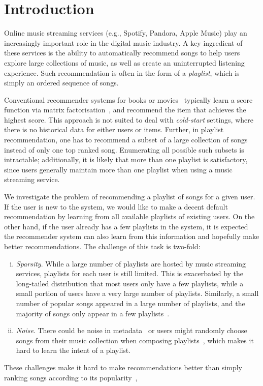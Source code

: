 
\section{Introduction}
\label{sec:intro}
Online music streaming services (e.g., Spotify, Pandora, Apple Music) %
play an increasingly important role in the digital music industry.
A key ingredient of these services is the ability to automatically recommend songs to help users explore large collections of music,
as well as create an uninterrupted listening experience.
Such recommendation is often in the form of a \emph{playlist}, which is simply an ordered sequence of songs.

Conventional recommender systems for books or movies~\citep{Sarwar:2001,Netflix}
typically learn a score function via matrix factorisation~\citep{Koren:2009},
and recommend the item that achieves the highest score.
This approach is not suited to deal with \emph{cold-start} settings,
where there is no historical data for either users or items.
%
Further, in playlist recommendation,
one has to recommend a subset of a large collection of songs instead of only one top ranked song.
Enumerating all possible such subsets is intractable;
additionally,
it is likely that more than one playlist is satisfactory, since
users generally maintain more than one playlist when using a music streaming service.

We investigate the problem of recommending a playlist of songs for a given user.
If the user is new to the system, we would like to make a decent default recommendation by learning from 
all available playlists of existing users.
On the other hand, if the user already has a few playlists in the system, it is expected the recommender 
system can also learn from this information and hopefully make better recommendations.
%
The challenge of this task is two-fold:
\begin{enumerate}[(i)]
	\item \emph{Sparsity}. While a large number of playlists are hosted by music streaming services,
playlists for each user is still limited. This is exacerbated by the long-tailed distribution that
most users only have a few playlists, while a small portion of users have a very large number of playlists.
Similarly, a small number of popular songs appeared in a large number of playlists, and the majority of songs
only appear in a few playlists~\cite{bonnin2013evaluating}.
	\item \emph{Noise}. There could be noise in metadata~\cite{bonnin2015automated} or users might randomly choose songs 
from their music collection when composing playlists~\cite{mcfee2012hypergraph},
which makes it hard to learn the intent of a playlist.
\end{enumerate}
These challenges make it hard to make recommendations better than simply ranking songs according to its 
popularity~\cite{mcfee2012million,bonnin2013evaluating,bonnin2015automated},


